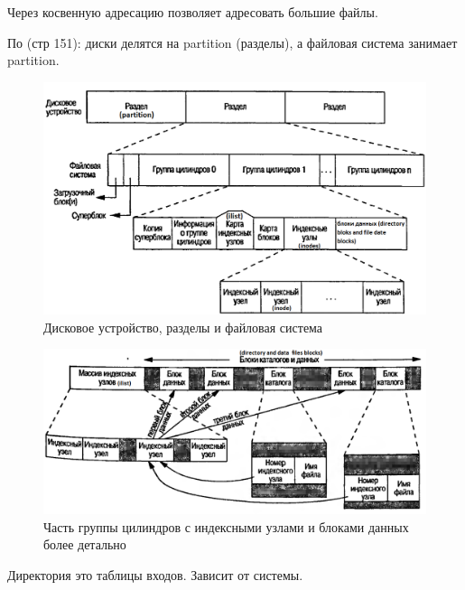 Через косвенную адресацию позволяет адресовать большие файлы.

По \cite{UNIX_Prof_prog} (стр 151): диски делятся на partition (разделы), а файловая система занимает partition.

\begin{figure}[H]
  \centering
  \includegraphics[width=\textwidth]{pic/8.png}
  \caption{Дисковое устройство, разделы и файловая система}
\end{figure}

\begin{figure}[H]
  \centering
  \includegraphics[width=\textwidth]{pic/6.png}
  \caption{Часть группы цилиндров с индексными узлами и блоками данных более детально}
\end{figure}

Директория это таблицы входов.
Зависит от системы.

 